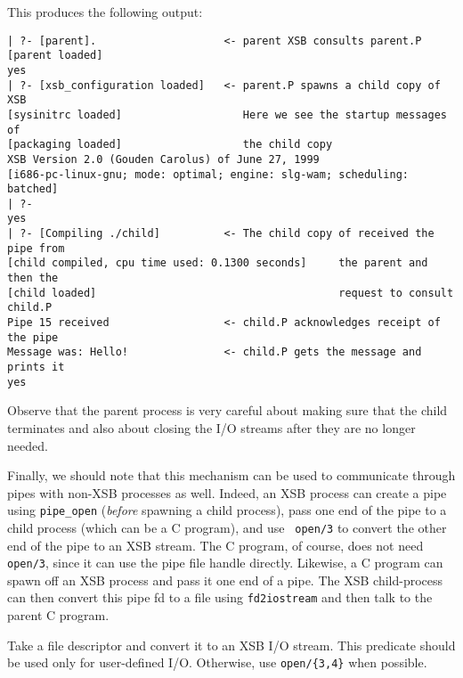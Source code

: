 \begin{description}
\begin{verbatim}
    \end{verbatim}
    This produces the following output:
    \begin{verbatim}
| ?- [parent].                    <- parent XSB consults parent.P
[parent loaded]
yes
| ?- [xsb_configuration loaded]   <- parent.P spawns a child copy of XSB
[sysinitrc loaded]                   Here we see the startup messages of
[packaging loaded]                   the child copy
XSB Version 2.0 (Gouden Carolus) of June 27, 1999
[i686-pc-linux-gnu; mode: optimal; engine: slg-wam; scheduling: batched]
| ?- 
yes
| ?- [Compiling ./child]          <- The child copy of received the pipe from
[child compiled, cpu time used: 0.1300 seconds]     the parent and then the
[child loaded]                                      request to consult child.P
Pipe 15 received                  <- child.P acknowledges receipt of the pipe
Message was: Hello!               <- child.P gets the message and prints it
yes       
    \end{verbatim}
    
    Observe that the parent process is very careful about making sure
    that the child terminates and also about closing the I/O streams
    after they are no longer needed.
    
    Finally, we should note that this mechanism can be used to
    communicate through pipes with non-XSB processes as well. Indeed,
    an XSB process can create a pipe using {\tt pipe\_open}
    (\emph{before} spawning a child process), pass one end of the pipe
    to a child process (which can be a C program), and use {\tt
    open/3} to convert the other end of the pipe to an XSB
    stream. The C program, of course, does not need {\tt open/3},
    since it can use the pipe file handle directly. Likewise, a C
    program can spawn off an XSB process and pass it one end of a
    pipe.  The XSB child-process can then convert this pipe fd to a
    file using {\tt fd2iostream} and then talk to the parent C program.

Take a file descriptor and convert it to an XSB I/O stream. This
predicate should be used only for user-defined I/O.  Otherwise, use
{\tt open/\{3,4\}} when possible.


\end{description}



